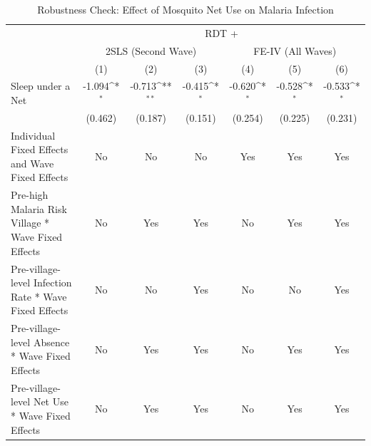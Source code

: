 \documentclass[fleqn,11pt]{article}
\newcommand{\sym}[1]{\rlap{$#1$}}
\def\sym#1{\ifmmode^{#1}\else\(^{#1}\)\fi
}
\begin{document}
\begin{table}[h]
\caption{Robustness Check: Effect of Mosquito Net Use on Malaria Infection}
\label{laterdt_child_app}\centering
\begin{adjustbox}{max width=\textwidth}
\begin{threeparttable}
\begin{tabular}{l*{6}{c}}
\hline\hline
&\multicolumn{6}{c}{RDT +}\\     \cmidrule(lr){2-7}
                                        &\multicolumn{3}{c}{2SLS (Second Wave)}&\multicolumn{3}{c}{FE-IV (All Waves)}\\  \cmidrule(lr){2-4}  \cmidrule(lr){5-7}

                    &\multicolumn{1}{c}{(1)}&\multicolumn{1}{c}{(2)}&\multicolumn{1}{c}{(3)}&\multicolumn{1}{c}{(4)}&\multicolumn{1}{c}{(5)}&\multicolumn{1}{c}{(6)}\\

\hline
Sleep under a Net      &      -1.094\sym{*}  &      -0.713\sym{**} &      -0.415\sym{*}  &      -0.620\sym{*}  &      -0.528\sym{*}  &      -0.533\sym{*}  \\
                    &     (0.462)         &     (0.187)         &     (0.151)         &     (0.254)         &     (0.225)         &     (0.231)         \\

Individual Fixed Effects and Wave Fixed Effects &          No         &          No         &          No         &         Yes         &         Yes         &         Yes         \\

Pre-high Malaria Risk Village * Wave Fixed Effects&          No         &         Yes         &         Yes         &          No         &         Yes         &         Yes         \\

Pre-village-level Infection Rate  * Wave Fixed Effects&          No         &          No         &          Yes         &          No         &          No         &         Yes         \\

Pre-village-level Absence * Wave Fixed Effects&          No         &         Yes         &         Yes        & No         &         Yes         &         Yes      \\

Pre-village-level Net Use * Wave Fixed Effects&         No         &         Yes         &         Yes        & No         &         Yes         &         Yes    \\


\end{tabular}
\end{threeparttable}
\end{adjustbox}
\end{table}
\end{document}
